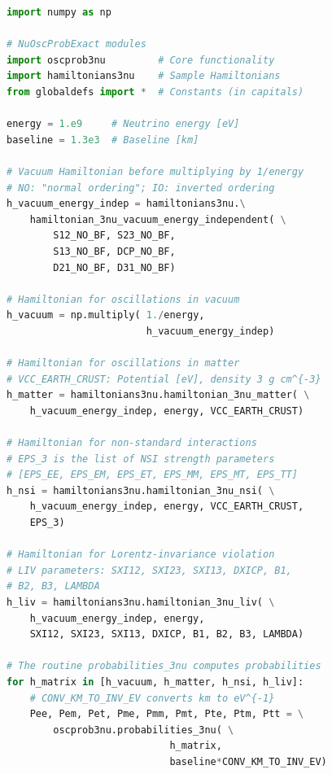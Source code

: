 \documentclass[final,5p,times,twocolumn,sort,compress]{elsarticle}
\begin{document}
\begin{lstlisting}[language=Python, caption={Code snippet to use {\tt NuOscProbExact} to compute three-neutrino oscillation probabilities in vacuum, matter of constant density, with non-standard interactions, and with a CPT-even Lorentz-violating background, for fixed neutrino energy $E = 1$~GeV and baseline $L = 1300$~km.  Constants --- with variable names in capitals --- are pulled from the {\tt globaldefs} module; see the main text for their values.  The printed output is what v1.13.1 produces.}, label={lst:3nu_examples}, float=t!]
import numpy as np

# NuOscProbExact modules
import oscprob3nu         # Core functionality
import hamiltonians3nu    # Sample Hamiltonians
from globaldefs import *  # Constants (in capitals)

energy = 1.e9     # Neutrino energy [eV]
baseline = 1.3e3  # Baseline [km]

# Vacuum Hamiltonian before multiplying by 1/energy
# NO: "normal ordering"; IO: inverted ordering
h_vacuum_energy_indep = hamiltonians3nu.\
    hamiltonian_3nu_vacuum_energy_independent( \
        S12_NO_BF, S23_NO_BF,
        S13_NO_BF, DCP_NO_BF,
        D21_NO_BF, D31_NO_BF)

# Hamiltonian for oscillations in vacuum
h_vacuum = np.multiply( 1./energy, 
                        h_vacuum_energy_indep)

# Hamiltonian for oscillations in matter                        
# VCC_EARTH_CRUST: Potential [eV], density 3 g cm^{-3}
h_matter = hamiltonians3nu.hamiltonian_3nu_matter( \
    h_vacuum_energy_indep, energy, VCC_EARTH_CRUST)

# Hamiltonian for non-standard interactions
# EPS_3 is the list of NSI strength parameters
# [EPS_EE, EPS_EM, EPS_ET, EPS_MM, EPS_MT, EPS_TT]
h_nsi = hamiltonians3nu.hamiltonian_3nu_nsi( \
    h_vacuum_energy_indep, energy, VCC_EARTH_CRUST, 
    EPS_3)

# Hamiltonian for Lorentz-invariance violation
# LIV parameters: SXI12, SXI23, SXI13, DXICP, B1,
# B2, B3, LAMBDA
h_liv = hamiltonians3nu.hamiltonian_3nu_liv( \
    h_vacuum_energy_indep, energy,
    SXI12, SXI23, SXI13, DXICP, B1, B2, B3, LAMBDA)

# The routine probabilities_3nu computes probabilities
for h_matrix in [h_vacuum, h_matter, h_nsi, h_liv]:
    # CONV_KM_TO_INV_EV converts km to eV^{-1}
    Pee, Pem, Pet, Pme, Pmm, Pmt, Pte, Ptm, Ptt = \
        oscprob3nu.probabilities_3nu( \
                            h_matrix,
                            baseline*CONV_KM_TO_INV_EV)


\end{lstlisting}
\end{document}
